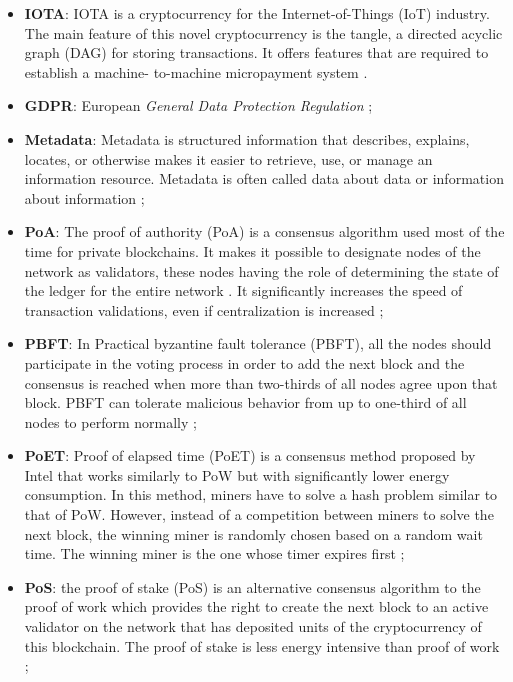 \begin{itemize}
    \item[] \textbf{IOTA}: IOTA is a cryptocurrency for the Internet-of-Things (IoT) industry. The main feature of this
    novel cryptocurrency is the tangle, a directed acyclic graph (DAG) for storing transactions. It offers features that are required to establish a machine-
    to-machine micropayment system \cite{Popov2017}.
    \item[] \textbf{GDPR}: European \emph{General Data Protection Regulation} \cite{EUdataregulations2018};
    \item[] \textbf{Metadata}: Metadata is structured information that describes, explains, locates, or otherwise makes it
    easier to retrieve, use, or manage
    an information resource. Metadata
    is often called data about data or 
    information about information \cite{NISO2004};
    \item[] \textbf{PoA}: The proof of authority (PoA) is a consensus algorithm used most of the
    time for private blockchains. It makes it possible to designate
    nodes of the network as validators, these nodes having the role
    of determining the state of the ledger for the entire network \cite{Quiniou2019}. It significantly increases the speed of
    transaction validations, even if centralization is increased \cite{Quiniou2019};
    \item[] \textbf{PBFT}: In Practical byzantine fault tolerance (PBFT), all the nodes should participate in the voting process in order to add the next block and the consensus
    is reached when more than two-thirds of all nodes agree upon that block. PBFT can tolerate malicious behavior from up to
    one-third of all nodes to perform normally \cite{Salimitari2020};
    \item[] \textbf{PoET}: Proof of elapsed time (PoET) is a consensus method proposed by Intel that works similarly to PoW but with significantly lower
    energy consumption. In this method, miners have to solve a hash problem similar to that of PoW. However, instead of a
    competition between miners to solve the next block, the winning miner is randomly chosen based on a random wait time.
    The winning miner is the one whose timer expires first \cite{Salimitari2020};
    \item[] \textbf{PoS}: the proof of stake (PoS) is an alternative consensus algorithm to the
    proof of work which provides the right to create the next block
    to an active validator on the network that has deposited units
    of the cryptocurrency of this blockchain. The proof of stake is less energy intensive than proof of work \cite{Quiniou2019};

\end{itemize}

